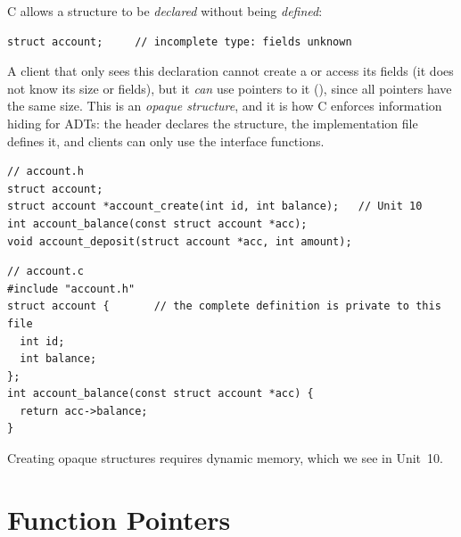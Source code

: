 C allows a structure to be \emph{declared} without being \emph{defined}:
\begin{lstlisting}[style=c]
struct account;     // incomplete type: fields unknown
\end{lstlisting}
A client that only sees this declaration cannot create a  or access its
fields (it does not know its size or fields), but it \emph{can} use pointers to it
(), since all pointers have the same size. This is an \emph{opaque
structure}, and it is how C enforces information hiding for ADTs: the header declares the
structure, the implementation file defines it, and clients can only use the interface functions.
\begin{lstlisting}[style=c]
// account.h
struct account;
struct account *account_create(int id, int balance);   // Unit 10
int account_balance(const struct account *acc);
void account_deposit(struct account *acc, int amount);
\end{lstlisting}
\begin{lstlisting}[style=c]
// account.c
#include "account.h"
struct account {       // the complete definition is private to this file
  int id;
  int balance;
};
int account_balance(const struct account *acc) {
  return acc->balance;
}
\end{lstlisting}
Creating opaque structures requires dynamic memory, which we see in Unit~10.

\section{Function Pointers}

